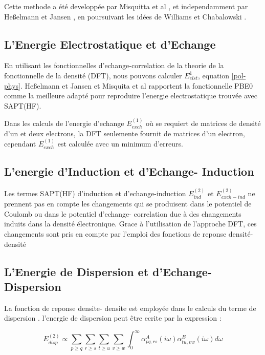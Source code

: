 Cette methode a été developpée par Misquitta et al \cite{misquitta2005intermolecular}, et independamment par Heßelmann et Jansen \cite{hesselmann2002first}, en poursuivant les idées de Williams et Chabalowski \cite{williams2001using}. 

\subsection{L'Energie Electrostatique et d'Echange }

En utilisant les fonctionnelles d'echange-correlation de la theorie de la fonctionnelle de la densité (DFT), nous pouvons calculer $E_{elst}^{1}$, equation \ref{pol-phys}. Heßelmann et Jansen \cite{hesselmann2002first} et Misquita et al \cite{misquitta2005symmetry} rapportent la fonctionnelle PBE0 comme la meilleure adapté pour reproduire l'energie electrostatique trouvée avec SAPT(HF). 

Dans les calculs de l'energie d'echange $E_{exch}^{(1)}$ où se requiert de matrices de densité d'un et deux electrons, la DFT seulemente fournit de matrices d'un electron, cependant $E_{exch}^{(1)}$ est calculée avec un minimum d'erreurs. 

\subsection{L'energie d'Induction et d'Echange- Induction}

Les termes SAPT(HF) d'induction et d'echange-induction $E_{ind}^{(2)}$ et $E_{exch-ind}^{(2)}$ ne prennent pas en compte les changements qui se produisent dans le potentiel de Coulomb ou dans le potentiel d'echange- correlation due à des changements induits dans la densité électronique. Grace à l'utilisation de l'approche DFT, ces changements sont pris en compte par l'emploi des fonctions de reponse densité- densité \cite{jansen2001comment}

\subsection{L'Energie de Dispersion et d'Echange- Dispersion}

La fonction de reponse densite- densite est employée dans le calculs du terme de dispersion \cite{hesselmann2003intermolecular}. l'energie de dispersion peut être ecrite par la expression :

\begin{equation}
E_{disp}^{(2)} \propto \sum_{p\geq q} \sum_{r\geq s} \sum_{t\geq u} \sum_{v\geq w} \int_{0}^{\infty} \alpha_{pq,rs}^{A} (i\omega) \alpha_{tu,vw}^{B} (i\omega) d\omega
\end{equation}
 

